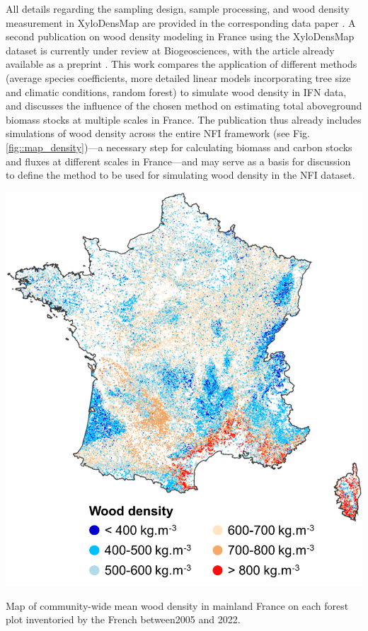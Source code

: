 All details regarding the sampling design, sample processing, and wood density measurement in Xylo\-Dens\-Map are provided in the corresponding data paper \parencite{Cuny2025}. A second publication on wood density modeling in France using the Xylo\-Dens\-Map dataset is currently under review at Biogeosciences, with the article already available as a preprint \parencite{Cuny2025_a}. This work compares the application of different methods (average species coefficients, more detailed linear models incorporating tree size and climatic conditions, random forest) to simulate wood density in IFN data, and discusses the influence of the chosen method on estimating total aboveground biomass stocks at multiple scales in France. The publication thus already includes simulations of wood density across the entire NFI framework (see Fig.  \ref{fig::map_density})---a necessary step for calculating biomass and carbon stocks and fluxes at different scales in France---and may serve as a basis for discussion to define the method to be used for simulating wood density in the NFI dataset.
\begin{marginfigure}[-4cm]
	\includegraphics[width = \marginparwidth]{./Figures/map_density.png}
	\caption{Map of community-wide mean wood density in mainland France on each forest plot inventoried by the French \NFI{} between2005 and 2022.\label{fig::map_density}}
\end{marginfigure}


